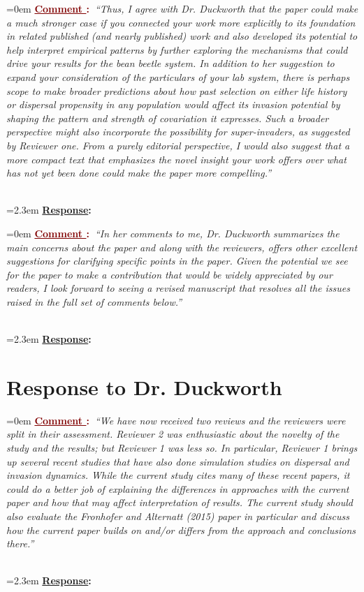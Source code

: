 \documentclass[12pt]{article}
\newcounter{cN}
\newcommand{\comment}[1]{
	\vspace{2em}
	\refstepcounter{cN} %
	\noindent \hangindent=0em \textbf{\textcolor{Maroon}{\uline{Comment \thecN}:~}}\emph{``#1''}
	}
\newcommand{\response}[1]{
	\\[0.25em]
	\hangindent=2.3em \textbf{\textcolor{NavyBlue}{\uline{Response}:~}}#1
	}
\begin{document}
\comment{Thus, I agree with Dr. Duckworth that the paper could make a much stronger case if you connected your work more explicitly to its foundation in related published (and nearly published) work and also developed its potential to help interpret empirical patterns by further exploring the mechanisms that could drive your results for the bean beetle system.
In addition to her suggestion to expand your consideration of the particulars of your lab system, there is perhaps scope to make broader predictions about how past selection on either life history or dispersal propensity in any population would affect its invasion potential by shaping the pattern and strength of covariation it expresses.
Such a broader perspective might also incorporate the possibility for super-invaders, as suggested by Reviewer one.
From a purely editorial perspective, I would also suggest that a more compact text that emphasizes the novel insight your work offers over what has not yet been done could make the paper more compelling.}
\response{}

\comment{In her comments to me, Dr. Duckworth summarizes the main concerns about the paper and along with the reviewers, offers other excellent suggestions for clarifying specific points in the paper.
Given the potential we see for the paper to make a contribution that would be widely appreciated by our readers, I look forward to seeing a revised manuscript that resolves all the issues raised in the full set of comments below.}
\response{}

\section{Response to Dr. Duckworth}
\vspace{-2em}

\comment{We have now received two reviews and the reviewers were split in their assessment. Reviewer 2 was enthusiastic about the novelty of the study and the results; but Reviewer 1 was less so. 
In particular, Reviewer 1 brings up several recent studies that have also done simulation studies on dispersal and invasion dynamics. 
While the current study cites many of these recent papers, it could do a better job of explaining the differences in approaches with the current paper and how that may affect interpretation of results. 
The current study should also evaluate the Fronhofer and Alternatt (2015) paper in particular and discuss how the current paper builds on and/or differs from the approach and conclusions there.}
\response{}
\end{document}
